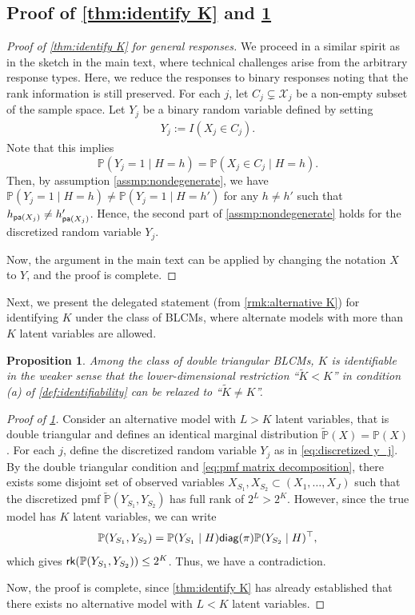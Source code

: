 \documentclass[10pt]{article} %
\newtheorem{proposition}{Proposition}
\newcommand{\PP}{\mathbb P}
\newcommand{\pa}{\textsf{\upshape pa}}
\newcommand{\rk}{\textsf{\upshape rk}}
\newcommand{\diag}{\textsf{\upshape diag}}
\def\tilde{\widetilde}
\begin{document}
\subsection{Proof of \cref{thm:identify K} and \cref{prop:identifiability of K}}
\begin{proof}[Proof of \cref{thm:identify K} for general responses]
    We proceed in a similar spirit as in the sketch in the main text, where technical challenges arise from the arbitrary response types. Here, we reduce the responses to binary responses noting that the rank information is still preserved. 
    For each $j$, let $C_{j} \subsetneq \mathcal{X}_j$ be a non-empty subset of the sample space. Let $Y_j$ be a binary random variable defined by setting 
    \begin{align}\label{eq:discretized y_j}
        Y_j := I(X_j \in C_j).
    \end{align}
    Note that this implies $$\PP(Y_j = 1 \mid H = h) = \PP(X_j \in C_j \mid H = h).$$
    Then, by assumption \cref{assmp:nondegenerate}, we have $\PP(Y_j = 1 \mid H = h) \neq \PP(Y_j = 1 \mid H = h')$ for any $h \neq h'$ such that $h_{\pa(X_j)} \neq h_{\pa(X_j)}'$. Hence, the second part of \cref{assmp:nondegenerate} holds for the discretized random variable $Y_j$. 

    Now, the argument in the main text can be applied by changing the notation $X$ to $Y$, and the proof is complete.
\end{proof}

Next, we present the delegated statement (from \cref{rmk:alternative K}) for identifying $K$ under the class of BLCMs, where alternate models with more than $K$ latent variables are allowed.
\begin{proposition}\label{prop:identifiability of K}
    Among the class of double triangular BLCMs, $K$ is identifiable in the weaker sense that the lower-dimensional restriction ``$\tilde{K} < K$'' in condition (a) of \cref{def:identifiability} can be relaxed to ``$\tilde{K} \neq K$''. 
\end{proposition}
\begin{proof}[Proof of \cref{prop:identifiability of K}]
    Consider an alternative model with $L > K$ latent variables, that is double triangular and defines an identical marginal distribution $\tilde{\PP}(X) = \PP(X)$. For each $j$, define the discretized random variable $Y_j$ as in \eqref{eq:discretized y_j}.
    By the double triangular condition and \eqref{eq:pmf matrix decomposition}, there exists some disjoint set of observed variables $X_{S_1}, X_{S_2} \subset (X_1, \ldots, X_J)$ such that the discretized pmf $\tilde{\PP}(Y_{S_1}, Y_{S_2})$ has full rank of $2^L > 2^K$. However, since the true model has $K$ latent variables, we can write
    $$\PP(Y_{S_1}, Y_{S_2}) = \PP(Y_{S_1} \mid H) \diag(\pi) \PP(Y_{S_2} \mid H)^\top,$$
    which gives $\rk(\PP(Y_{S_1}, Y_{S_2})) \le 2^K$. Thus, we have a contradiction.

    Now, the proof is complete, since \cref{thm:identify K} has already established that there exists no alternative model with $L < K$ latent variables.
\end{proof}
\end{document}
